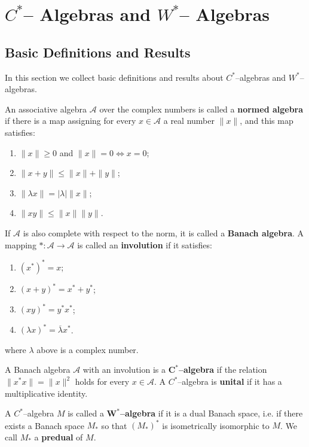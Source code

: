 \chapter{\boldmath\texorpdfstring{$C^{*}$}{CStar}-- Algebras and \boldmath\texorpdfstring{$W^{*}$}{WStar}-- Algebras}

\section{Basic Definitions and Results}

In this section we collect basic definitions and results about $C^{*}$--algebras and $W^{*}$--algebras.

An associative algebra $\mathcal{A}$ over the complex numbers is called a \textbf{normed algebra}
  if there is a map assigning for every $x\in \mathcal{A}$ a real number $\|x\|$, and this map satisfies:
  \begin{enumerate}
  \item $\|x\|\ge 0$ and $\|x\|=0 \iff x=0$;
  \item $\|x+y\|\le \|x\|+\|y\|$;
  \item $\|\lambda x\|= |\lambda|\|x\|$;
  \item $\|xy\|\le \|x\|\|y\|$.
  \end{enumerate}
  If $\mathcal{A}$ is also complete with respect to the norm, it is called a \textbf{Banach algebra}.
  A mapping $*: \mathcal{A}\to \mathcal{A}$ is called an \textbf{involution} if it satisfies:
  \begin{enumerate}
  \item $(x^{*})^{*}=x$;
  \item $(x+y)^{*}=x^{*}+y^{*}$;
  \item $(xy)^{*}=y^{*}x^{*}$;
  \item $(\lambda x)^{*}=\overline{\lambda}x^{*}$.
  \end{enumerate}
  where $\lambda$ above is a complex number.

\begin{definition}
  \label{def:cstar_def}
  \mathlibok
  A Banach algebra $\mathcal{A}$ with an involution is a $\mathbf{C^{*}}$\textbf{--algebra} if the relation
  $\|x^{*}x\|=\|x\|^{2}$ holds for every $x\in \mathcal{A}$. A $C^{*}$--algebra is \textbf{unital} if it has a multiplicative
  identity.
\end{definition}

\begin{definition}
  \label{def:wstar_def}
  \leanok
  A $C^{*}$--algebra $M$ is called a $\mathbf{W^{*}}$\textbf{--algebra} if it is a dual Banach space, i.e. if there exists a Banach space
  $M_{*}$ so that $(M_{*})^{*}$ is isometrically isomorphic to $M$. We call $M_{*}$ a \textbf{predual} of $M$.
\end{definition}

